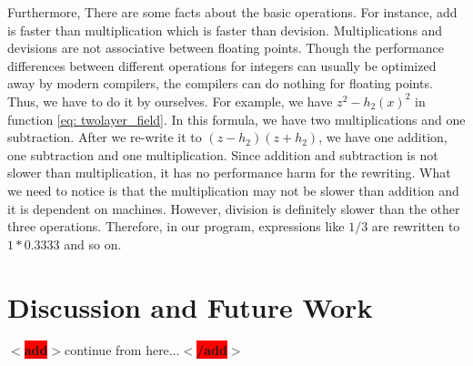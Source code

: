 \documentclass[12pt]{report}
\newcommand{\add}[1]{
  $<$\colorbox{red}{\textbf{add}}$>$#1$<$\colorbox{red}{\textbf{/add}}$>$
}
\begin{document}
          Furthermore, There are some facts about the basic operations. For instance, add is faster than 
          multiplication which is faster than devision. Multiplications and devisions are not associative
          between floating points. 
          Though the performance differences between different operations for integers can usually be optimized 
          away by modern compilers, the compilers can do nothing for floating points. Thus, we have to do it 
          by ourselves. For example, we have $z^2 - h_2\left(x\right)^2$ in function \ref{eq: twolayer_field}.
          In this formula, we have two multiplications and one subtraction. After we re-write it to 
          $\left(z-h_2\right)\left(z + h_2\right)$, we have one addition, one subtraction and one multiplication.
          Since addition and subtraction is not slower than multiplication, it has no performance harm 
          for the rewriting. What we need to notice is that the multiplication may not be slower than addition
          and it is dependent on machines. However, division is definitely slower than the other three operations. 
          Therefore, in our program, expressions like $1 / 3$ are rewritten to $1*0.3333$ and so on.  

      \chapter{Discussion and Future Work}
        \add{continue from here...}


        





          
\end{document}
